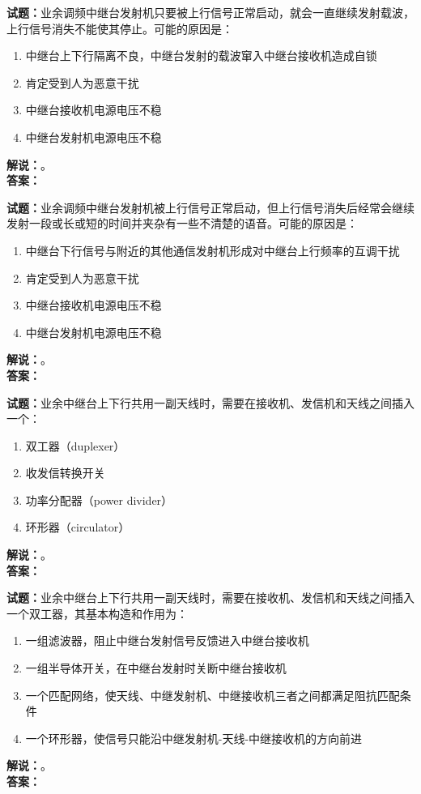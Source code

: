 \documentclass{ctexbook}
\begin{document}
\bigskip

\noindent\textbf{试题：}业余调频中继台发射机只要被上行信号正常启动，就会一直继续发射载波，上行信号消失不能使其停止。可能的原因是：
\begin{enumerate}[leftmargin=3em]
  \item 中继台上下行隔离不良，中继台发射的载波窜入中继台接收机造成自锁
  \item 肯定受到人为恶意干扰
  \item 中继台接收机电源电压不稳
  \item 中继台发射机电源电压不稳
\end{enumerate}
\noindent\textbf{解说：}\textbf{}。\\\noindent\textbf{答案：}

\bigskip

\noindent\textbf{试题：}业余调频中继台发射机被上行信号正常启动，但上行信号消失后经常会继续发射一段或长或短的时间并夹杂有一些不清楚的语音。可能的原因是：
\begin{enumerate}[leftmargin=3em]
  \item 中继台下行信号与附近的其他通信发射机形成对中继台上行频率的互调干扰
  \item 肯定受到人为恶意干扰
  \item 中继台接收机电源电压不稳
  \item 中继台发射机电源电压不稳
\end{enumerate}
\noindent\textbf{解说：}\textbf{}。\\\noindent\textbf{答案：}

\bigskip

\noindent\textbf{试题：}业余中继台上下行共用一副天线时，需要在接收机、发信机和天线之间插入一个：
\begin{enumerate}[leftmargin=3em]
  \item 双工器（duplexer）
  \item 收发信转换开关
  \item 功率分配器（power divider）
  \item 环形器（circulator）
\end{enumerate}
\noindent\textbf{解说：}\textbf{}。\\\noindent\textbf{答案：}

\bigskip

\noindent\textbf{试题：}业余中继台上下行共用一副天线时，需要在接收机、发信机和天线之间插入一个双工器，其基本构造和作用为：
\begin{enumerate}[leftmargin=3em]
  \item 一组滤波器，阻止中继台发射信号反馈进入中继台接收机
  \item 一组半导体开关，在中继台发射时关断中继台接收机
  \item 一个匹配网络，使天线、中继发射机、中继接收机三者之间都满足阻抗匹配条件
  \item 一个环形器，使信号只能沿中继发射机-天线-中继接收机的方向前进
\end{enumerate}
\noindent\textbf{解说：}\textbf{}。\\\noindent\textbf{答案：}
\end{document}
